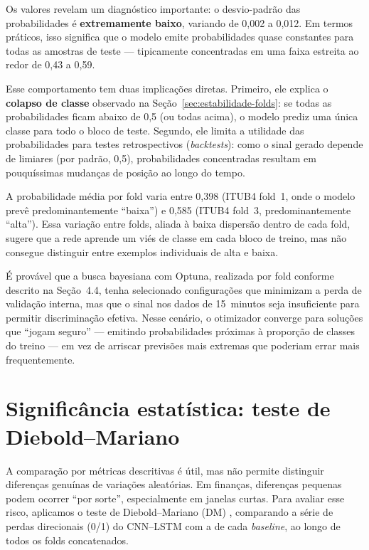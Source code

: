 Os valores revelam um diagnóstico importante: o desvio-padrão das probabilidades é
\textbf{extremamente baixo}, variando de 0,002 a 0,012. Em termos práticos, isso significa
que o modelo emite probabilidades quase constantes para todas as amostras de teste ---
tipicamente concentradas em uma faixa estreita ao redor de 0,43 a 0,59.

Esse comportamento tem duas implicações diretas.
Primeiro, ele explica o \textbf{colapso de classe} observado na Seção~\ref{sec:estabilidade-folds}:
se todas as probabilidades ficam abaixo de 0,5 (ou todas acima), o modelo prediz uma única
classe para todo o bloco de teste.
Segundo, ele limita a utilidade das probabilidades para testes retrospectivos (\textit{backtests}): como o sinal gerado
depende de limiares (por padrão, 0,5), probabilidades concentradas resultam em pouquíssimas
mudanças de posição ao longo do tempo.

A probabilidade média por fold varia entre 0,398 (ITUB4 fold~1, onde o modelo prevê
predominantemente ``baixa'') e 0,585 (ITUB4 fold~3, predominantemente ``alta'').
Essa variação entre folds, aliada à baixa dispersão dentro de cada fold, sugere que a rede
aprende um viés de classe em cada bloco de treino, mas não consegue distinguir entre exemplos
individuais de alta e baixa.

É provável que a busca bayesiana com Optuna, realizada por fold conforme descrito na
Seção~4.4, tenha selecionado configurações que minimizam a perda de validação interna,
mas que o sinal nos dados de 15~minutos seja insuficiente para permitir discriminação efetiva.
Nesse cenário, o otimizador converge para soluções que ``jogam seguro'' ---
emitindo probabilidades próximas à proporção de classes do treino --- em vez de arriscar
previsões mais extremas que poderiam errar mais frequentemente.

\section{Significância estatística: teste de Diebold--Mariano}
\label{sec:dm}

A comparação por métricas descritivas é útil, mas não permite distinguir diferenças genuínas
de variações aleatórias. Em finanças, diferenças pequenas podem ocorrer ``por sorte'',
especialmente em janelas curtas. Para avaliar esse risco, aplicamos o teste de Diebold--Mariano
(DM) \cite{diebold1995}, comparando a série de perdas direcionais (0/1) do CNN--LSTM com a de
cada \textit{baseline}, ao longo de todos os folds concatenados.


